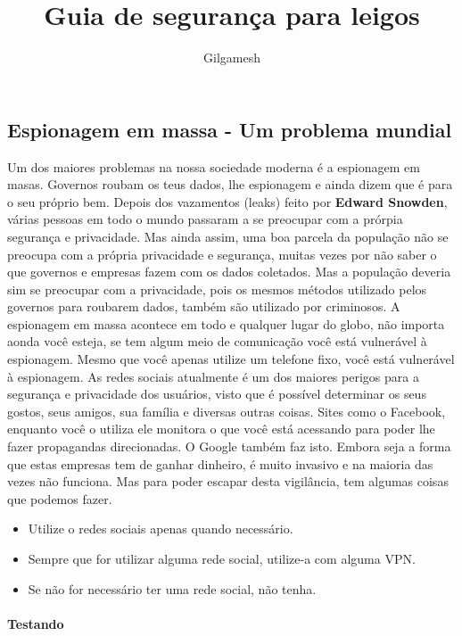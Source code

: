 \documentclass[12pt]{report}
\title{\Huge Guia de seguran\c{c}a para leigos}
\author{Gilgamesh}
\begin{document}
\maketitle
\pagebreak
\begin{flushleft}
\section*{Espionagem em massa - Um problema mundial}
\large Um dos maiores problemas na nossa sociedade moderna é a espionagem em masas. Governos roubam os teus dados, lhe espionagem e ainda dizem que é para o seu próprio bem.
	Depois dos vazamentos (leaks) feito por \textbf{Edward Snowden}, várias pessoas em todo o mundo passaram a se preocupar com a prórpia segurança e privacidade. Mas ainda assim, uma boa parcela da população não se preocupa com a própria privacidade e segurança, muitas vezes por não saber o que governos e empresas fazem com os dados coletados. Mas a população deveria sim se  preocupar com a privacidade, pois os mesmos métodos utilizado pelos governos para roubarem dados, também são utilizado por criminosos.
	A espionagem em massa acontece em todo e qualquer lugar do globo, não importa aonda você esteja, se tem algum meio de comunicação você está vulnerável à espionagem. Mesmo que você apenas utilize um telefone fixo, você está vulnerável à espionagem.
	As redes sociais atualmente é um dos maiores perigos para a segurança e privacidade dos usuários, visto que é possível determinar os seus gostos, seus amigos, sua família e diversas outras coisas. Sites como o Facebook, enquanto você o utiliza ele monitora o que você está acessando para poder lhe fazer propagandas direcionadas. O Google também faz isto. Embora seja a forma que estas empresas tem de ganhar dinheiro, é muito invasivo e na maioria das vezes não funciona. Mas para poder escapar desta vigilância, tem algumas coisas que podemos fazer.
	\begin{itemize}
		\item Utilize o redes sociais apenas quando necessário.
		\item Sempre que for utilizar alguma rede social, utilize-a com alguma VPN.
		\item Se não for necessário ter uma rede social, não tenha.
	\end{itemize}
	\paragraph{Testando}

\end{flushleft}
\end{document}
